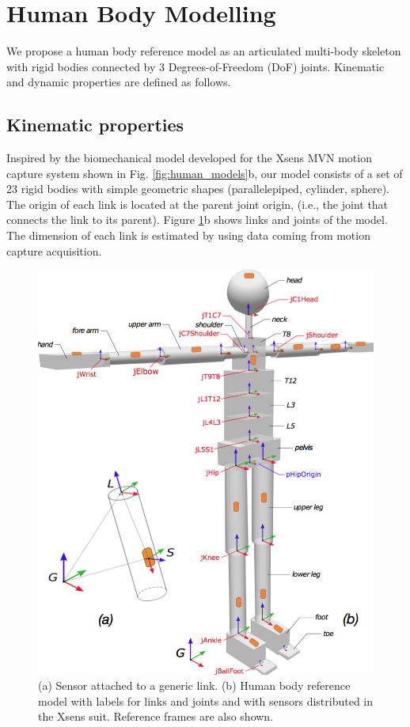 
\section{Human Body Modelling}

We propose a human body reference model as an articulated multi-body skeleton with rigid
 bodies connected by 3 Degrees-of-Freedom (DoF) joints. Kinematic and dynamic properties 
 are defined as follows.
%
\subsection{Kinematic properties}
Inspired by the biomechanical model developed for the Xsens MVN motion capture system
 \cite{Roetenberg2009} shown in Fig. \ref{fig:human_models}b, our model consists of a set of 
 23 rigid bodies with simple geometric
  shapes (parallelepiped, cylinder, sphere).  The origin of each link is located at 
  the parent joint origin, (i.e., the joint that connects the link to its
  parent). Figure \ref{fig:figs_human_JointLink}b shows  links and joints of the model.  
  The dimension of 
   each link is estimated by using data coming from motion capture acquisition.
%
\begin{figure}
  \centering
    \includegraphics[width=1\columnwidth]{figs/human_JointLink}
\caption[Caption for LOF]{(a) Sensor attached to a generic link. 
(b) Human body reference model with labels for links and joints 
and with sensors distributed in the Xsens suit.  
 Reference frames are also shown\footnotemark.}
  \label{fig:figs_human_JointLink}
\end{figure}
